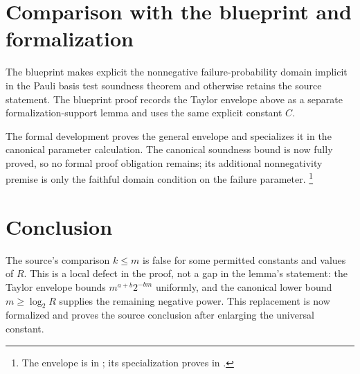 \documentclass[11pt]{article}
\begin{document}
\section{Comparison with the blueprint and formalization}

The blueprint makes explicit the nonnegative failure-probability domain
implicit in the Pauli basis test soundness theorem and otherwise retains the
source statement.
The blueprint proof records the Taylor envelope above as a separate
formalization-support lemma and uses the same explicit constant $C$.

The formal development proves the general envelope and specializes it in the
canonical parameter calculation.  The canonical soundness bound is now fully
proved, so no formal proof obligation remains; its additional nonnegativity
premise is only the faithful domain condition on the failure parameter.%
\footnote{The envelope is
 in
; its specialization proves
 in
.}

\section{Conclusion}

The source's comparison $k\leq m$ is false for some permitted constants and
values of $R$.  This is a local defect in the proof, not a gap in the lemma's
statement: the Taylor envelope bounds $m^{a+b}2^{-bm}$ uniformly, and the
canonical lower bound $m\geq\log_2 R$ supplies the remaining negative power.
This replacement is now formalized and proves the source conclusion after
enlarging the universal constant.



\end{document}
